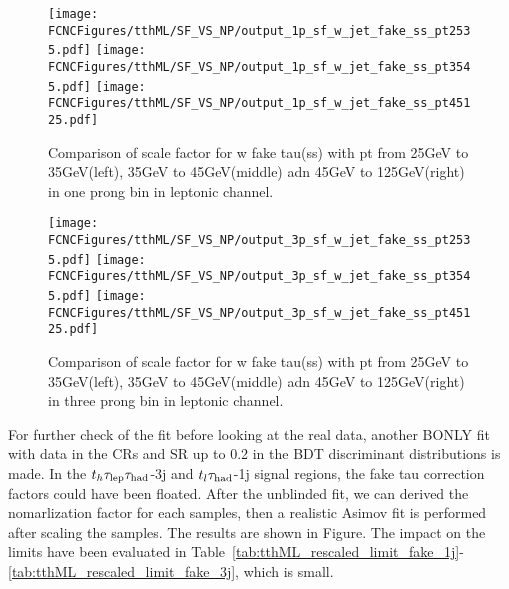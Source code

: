 \begin{figure}[H]
\centering
\texttt{[image: \\FCNCFigures/tthML/SF\_VS\_NP/output\_1p\_sf\_w\_jet\_fake\_ss\_pt2535.pdf]}
\texttt{[image: \\FCNCFigures/tthML/SF\_VS\_NP/output\_1p\_sf\_w\_jet\_fake\_ss\_pt3545.pdf]}
\texttt{[image: \\FCNCFigures/tthML/SF\_VS\_NP/output\_1p\_sf\_w\_jet\_fake\_ss\_pt45125.pdf]}
\\
\caption{Comparison of scale factor for w fake tau(ss) with pt from 25GeV to 35GeV(left), 35GeV to 45GeV(middle) adn 45GeV to 125GeV(right) in one prong bin in leptonic channel.}
\label{fig:1p_sf_b_fake_pt2535}
\end{figure}

\begin{figure}[H]
\centering
\texttt{[image: \\FCNCFigures/tthML/SF\_VS\_NP/output\_3p\_sf\_w\_jet\_fake\_ss\_pt2535.pdf]}
\texttt{[image: \\FCNCFigures/tthML/SF\_VS\_NP/output\_3p\_sf\_w\_jet\_fake\_ss\_pt3545.pdf]}
\texttt{[image: \\FCNCFigures/tthML/SF\_VS\_NP/output\_3p\_sf\_w\_jet\_fake\_ss\_pt45125.pdf]}
\\
\caption{Comparison of scale factor for w fake tau(ss) with pt from 25GeV to 35GeV(left), 35GeV to 45GeV(middle) adn 45GeV to 125GeV(right) in three prong bin in leptonic channel.}
\label{fig:3p_sf_b_fake_pt2535}
\end{figure}


For further check of the fit before looking at the real data, another BONLY fit with data in the CRs and SR up to 0.2 in the BDT discriminant distributions is made. In the $t_h\tau_\text{lep}{}\tau_\text{had}$-3j and $t_l\tau_\text{had}$-1j signal regions, the fake tau correction factors could have been floated. After the unblinded fit, we can derived the nomarlization factor for each samples, then a realistic Asimov fit is performed after scaling the samples. The results are shown in Figure. The impact on the limits have been evaluated in Table~\ref{tab:tthML_rescaled_limit_fake_1j}-\ref{tab:tthML_rescaled_limit_fake_3j}, which is small.

